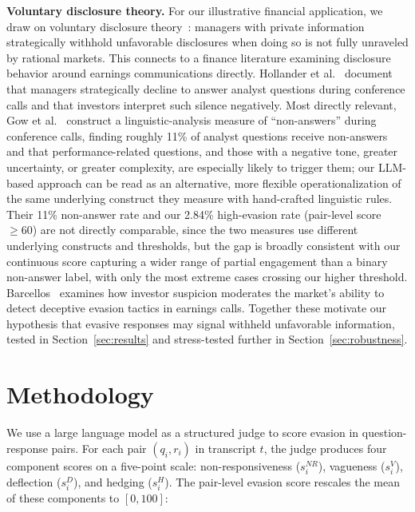 \documentclass[conference]{IEEEtran}
\begin{document}
\textbf{Voluntary disclosure theory.} For our illustrative financial application, we draw on voluntary disclosure theory~\cite{dye1985disclosure,verrecchia2001essays}: managers with private information strategically withhold unfavorable disclosures when doing so is not fully unraveled by rational markets. This connects to a finance literature examining disclosure behavior around earnings communications directly. Hollander et al.~\cite{hollander2010silence} document that managers strategically decline to answer analyst questions during conference calls and that investors interpret such silence negatively. Most directly relevant, Gow et al.~\cite{gow2021nonanswers} construct a linguistic-analysis measure of ``non-answers'' during conference calls, finding roughly 11\% of analyst questions receive non-answers and that performance-related questions, and those with a negative tone, greater uncertainty, or greater complexity, are especially likely to trigger them; our LLM-based approach can be read as an alternative, more flexible operationalization of the same underlying construct they measure with hand-crafted linguistic rules. Their 11\% non-answer rate and our 2.84\% high-evasion rate (pair-level score $\geq 60$) are not directly comparable, since the two measures use different underlying constructs and thresholds, but the gap is broadly consistent with our continuous score capturing a wider range of partial engagement than a binary non-answer label, with only the most extreme cases crossing our higher threshold. Barcellos~\cite{barcellos2025overcoming} examines how investor suspicion moderates the market's ability to detect deceptive evasion tactics in earnings calls. Together these motivate our hypothesis that evasive responses may signal withheld unfavorable information, tested in Section~\ref{sec:results} and stress-tested further in Section~\ref{sec:robustness}.

\section{Methodology}
\label{sec:methodology}

We use a large language model as a structured judge to score evasion in question-response pairs. For each pair $(q_i, r_i)$ in transcript $t$, the judge produces four component scores on a five-point scale: non-responsiveness ($s_i^{NR}$), vagueness ($s_i^{V}$), deflection ($s_i^{D}$), and hedging ($s_i^{H}$). The pair-level evasion score rescales the mean of these components to $[0, 100]$:
\end{document}
